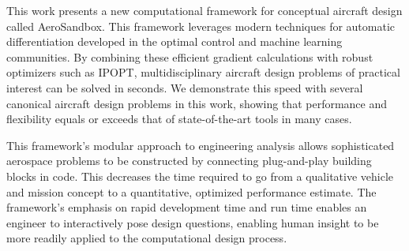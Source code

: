 This work presents a new computational framework for conceptual aircraft design called AeroSandbox. This framework leverages modern techniques for automatic differentiation developed in the optimal control and machine learning communities. By combining these efficient gradient calculations with robust optimizers such as IPOPT, multidisciplinary aircraft design problems of practical interest can be solved in seconds. We demonstrate this speed with several canonical aircraft design problems in this work, showing that performance and flexibility equals or exceeds that of state-of-the-art tools in many cases.

This framework's modular approach to engineering analysis allows sophisticated aerospace problems to be constructed by connecting plug-and-play building blocks in code. This decreases the time required to go from a qualitative vehicle and mission concept to a quantitative, optimized performance estimate. The framework's emphasis on rapid development time and run time enables an engineer to interactively pose design questions, enabling human insight to be more readily applied to the computational design process.